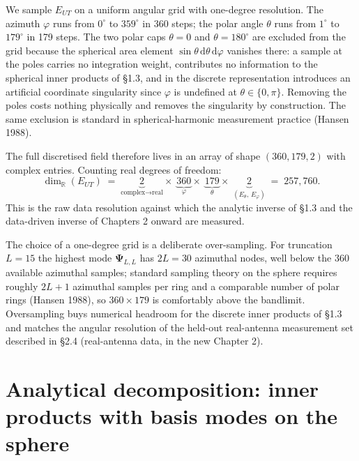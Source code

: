 \documentclass[11pt,a4paper]{report}
\begin{document}
We sample $E_{UT}$ on a uniform angular grid with one-degree resolution. The azimuth
$\varphi$ runs from $0^{\circ}$ to $359^{\circ}$ in 360 steps; the polar angle
$\theta$ runs from $1^{\circ}$ to $179^{\circ}$ in 179 steps. The two polar caps
$\theta=0$ and $\theta=180^{\circ}$ are excluded from the grid because the spherical
area element $\sin\theta\,\mathrm{d}\theta\,\mathrm{d}\varphi$ vanishes there: a
sample at the poles carries no integration weight, contributes no information to the
spherical inner products of \S1.3, and in the discrete representation introduces an
artificial coordinate singularity since $\varphi$ is undefined at
$\theta\in\{0,\pi\}$. Removing the poles costs nothing physically and removes the
singularity by construction. The same exclusion is standard in spherical-harmonic
measurement practice (Hansen 1988).

The full discretised field therefore lives in an array of shape $(360, 179, 2)$ with
complex entries. Counting real degrees of freedom:
\[
\dim_{\mathbb R}(E_{UT}) \;=\; \underbrace{2}_{\text{complex} \to \text{real}} \times\; \underbrace{360}_{\varphi}\times\; \underbrace{179}_{\theta}\times\; \underbrace{2}_{(E_\theta,\,E_\varphi)} \;=\; 257{,}760.
\]
This is the raw data resolution against which the analytic inverse of \S1.3 and the
data-driven inverse of Chapters 2 onward are measured.

The choice of a one-degree grid is a deliberate over-sampling. For truncation $L=15$
the highest mode $\boldsymbol{\Psi}_{L,L}$ has $2L=30$ azimuthal nodes, well below the
$360$ available azimuthal samples; standard sampling theory on the sphere requires
roughly $2L+1$ azimuthal samples per ring and a comparable number of polar rings
(Hansen 1988), so $360 \times 179$ is comfortably above the bandlimit. Oversampling
buys numerical headroom for the discrete inner products of \S1.3 and matches the
angular resolution of the held-out real-antenna measurement set described in \S2.4
(real-antenna data, in the new Chapter 2).
\section{Analytical decomposition: inner products with basis modes on the sphere}
\end{document}
